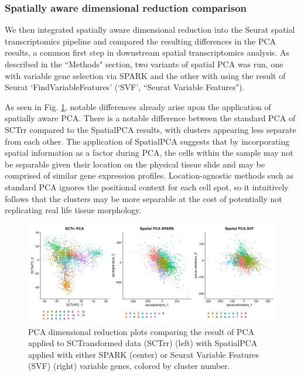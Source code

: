 \documentclass{article}
\begin{document}
\subsubsection*{Spatially aware dimensional reduction comparison}

We then integrated spatially aware dimensional reduction into the Seurat spatial transcriptomics pipeline and compared the resulting differences in the PCA results, a common first step in downstream spatial transcriptomics analysis. As described in the ``Methods" section, two variants of spatial PCA was run, one with variable gene selection via SPARK\citep{sun_statistical_2020} and the other with using the result of Seurat `FindVariableFeatures' (`SVF', ``Seurat Variable Features").

As seen in Fig. \ref{fig:DimPlotPCA}, notable differences already arise upon the application of spatially aware PCA. There is a notable difference between the standard PCA of SCTrr compared to the SpatialPCA results, with clusters appearing less separate from each other. The application of SpatialPCA suggests that by incorporating spatial information as a factor during PCA, the cells within the sample may not be separable given their location on the physical tissue slide and may be comprised of similar gene expression profiles. Location-agnostic methods such as standard PCA ignores the positional context for each cell spot, so it intuitively follows that the clusters may be more separable at the cost of potentially not replicating real life tissue morphology.

\begin{figure}[h!]
    \centering
    \includegraphics[width=\textwidth]{images/DimPlotPCA_D_GTFB1170_SmallCellOvarianCancer_pw_strip.png}
    \caption{PCA dimensional reduction plots comparing the result of PCA applied to SCTransformed data (SCTrr) (left) with SpatialPCA applied with either SPARK (center) or Seurat Variable Features (SVF) (right) variable genes, colored by cluster number.}
    \label{fig:DimPlotPCA}
\end{figure}
\end{document}

